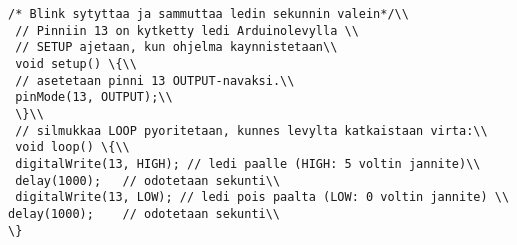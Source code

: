 \documentclass[preview]{standalone}
\begin{document}
\begin{lstlisting}[language=Arduino]  
 /* Blink sytyttaa ja sammuttaa ledin sekunnin valein*/\\
 // Pinniin 13 on kytketty ledi Arduinolevylla \\
 // SETUP ajetaan, kun ohjelma kaynnistetaan\\
 void setup() \{\\
 // asetetaan pinni 13 OUTPUT-navaksi.\\
 pinMode(13, OUTPUT);\\
 \}\\
 // silmukkaa LOOP pyoritetaan, kunnes levylta katkaistaan virta:\\
 void loop() \{\\
 digitalWrite(13, HIGH); // ledi paalle (HIGH: 5 voltin jannite)\\
 delay(1000);	// odotetaan sekunti\\
 digitalWrite(13, LOW); // ledi pois paalta (LOW: 0 voltin jannite) \\
delay(1000);	// odotetaan sekunti\\   
\}
    
\end{lstlisting}
\end{document}
